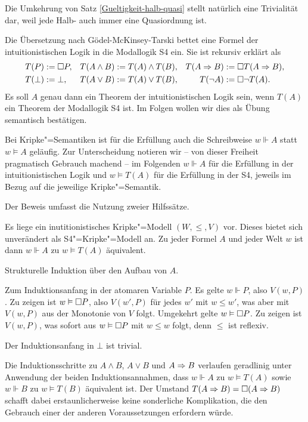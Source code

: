 \noindent
Die Umkehrung von Satz \ref{Gueltigkeit-halb-quasi} stellt natürlich
eine Trivialität dar, weil jede Halb- auch immer eine Quasiordnung ist.

Die Übersetzung nach Gödel-McKinsey-Tarski bettet eine Formel
der intuitionistischen Logik in die Modallogik S4 ein. Sie ist
rekursiv erklärt als
\begin{align*}
T(P) &:= \Box P, & T(A\land B) &:= T(A)\land T(B), & T(A\Rightarrow B) &:= \Box T(A\Rightarrow B),\\
T(\bot) &:= \bot, & T(A\lor B) &:= T(A)\lor T(B), & T(\lnot A) &:= \Box\lnot T(A).
\end{align*}
Es soll $A$ genau dann ein Theorem der intuitionistischen Logik sein,
wenn $T(A)$ ein Theorem der Modallogik S4 ist. Im Folgen wollen wir
dies als Übung semantisch bestätigen.

Bei Kripke"=Semantiken ist für die Erfüllung auch die Schreibweise
$w\Vdash A$ statt $w\models A$ geläufig. Zur Unterscheidung notieren wir
-- von dieser Freiheit pragmatisch Gebrauch machend -- im Folgenden
$w\Vdash A$ für die Erfüllung in der intuitionistischen Logik und
$w\models T(A)$ für die Erfüllung in der S4, jeweils im Bezug auf die
jeweilige Kripke"=Semantik.

Der Beweis umfasst die Nutzung zweier Hilfssätze.

\begin{Satz}\label{Erf-Modell-S4-aus-Int}
Es liege ein inutitionistisches Kripke"=Modell $(W,\le,V)$ vor.
Dieses bietet sich unverändert als S4"=Kripke"=Modell an. Zu jeder Formel $A$
und jeder Welt $w$ ist dann $w\Vdash A$ zu $w\models T(A)$ äquivalent.
\end{Satz}
\begin{Beweis}[Beweisskizze]
Strukturelle Induktion über den Aufbau von $A$.

Zum Induktionsanfang in der atomaren Variable $P$. Es gelte $w\Vdash P$,
also $V(w,P)$. Zu zeigen ist $w\vDash\Box P$, also $V(w',P)$
für jedes $w'$ mit $w\le w'$, was aber mit $V(w,P)$ aus der Monotonie
von $V$ folgt. Umgekehrt gelte $w\vDash\Box P$. Zu zeigen ist
$V(w,P)$, was sofort aus $w\vDash\Box P$ mit $w\le w$ folgt,
denn $\le$ ist reflexiv.

Der Induktionsanfang in $\bot$ ist trivial.

Die Induktionsschritte zu $A\land B$, $A\lor B$ und $A\Rightarrow B$ verlaufen
geradlinig unter Anwendung der beiden Induktionsannahmen, dass $w\Vdash A$
zu $w\models T(A)$ sowie $w\Vdash B$ zu $w\models T(B)$ äquivalent ist.
Der Umstand $T(A\Rightarrow B)=\Box(A\Rightarrow B)$ schafft dabei
erstaunlicherweise keine sonderliche Komplikation, die den Gebrauch einer
der anderen Voraussetzungen erfordern würde.\,\qedsymbol
\end{Beweis}

